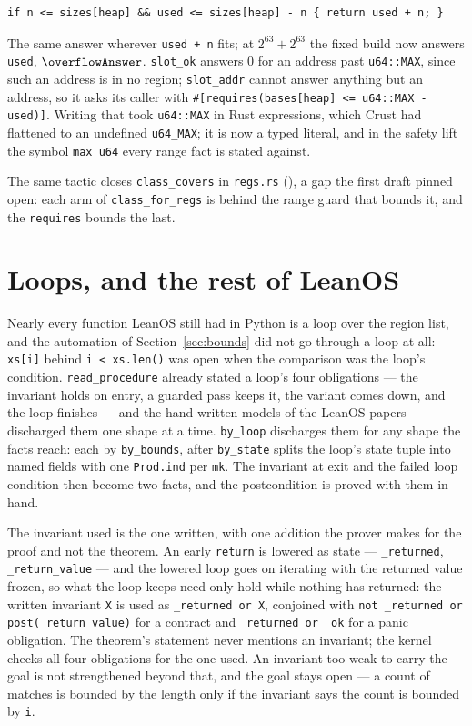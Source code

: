 \documentclass[11pt]{article}
\begin{document}
\begin{lstlisting}
if n <= sizes[heap] && used <= sizes[heap] - n { return used + n; }
\end{lstlisting}

The same answer wherever \texttt{used + n} fits; at $2^{63} + 2^{63}$ the
fixed build now answers \texttt{used}, $\overflowAnswer$.
\texttt{slot\_ok} answers 0 for an address past \texttt{u64::MAX}, since
such an address is in no region; \texttt{slot\_addr} cannot answer
anything but an address, so it asks its caller with
\texttt{\#[requires(bases[heap] <= u64::MAX - used)]}.  Writing that took
\texttt{u64::MAX} in Rust expressions, which Crust had flattened to an
undefined \texttt{u64\_MAX}; it is now a typed literal, and in the safety
lift the symbol \texttt{max\_u64} every range fact is stated against.

The same tactic closes \texttt{class\_covers} in \texttt{regs.rs}
(\classCoversProved{}), a gap the first draft pinned open: each arm of
\texttt{class\_for\_regs} is behind the range guard that bounds it, and the
\texttt{requires} bounds the last.

\section{Loops, and the rest of LeanOS}\label{sec:loops}

Nearly every function LeanOS still had in Python is a loop over the region
list, and the automation of Section~\ref{sec:bounds} did not go through a
loop at all: \texttt{xs[i]} behind \texttt{i < xs.len()} was open when the
comparison was the loop's condition.  \texttt{read\_procedure} already
stated a loop's four obligations --- the invariant holds on entry, a guarded
pass keeps it, the variant comes down, and the loop finishes --- and the
hand-written models of the LeanOS papers discharged them one shape at a
time.  \texttt{by\_loop} discharges them for any shape the facts reach:
each by \texttt{by\_bounds}, after \texttt{by\_state} splits the loop's
state tuple into named fields with one \texttt{Prod.ind} per \texttt{mk}.
The invariant at exit and the failed loop condition then become two facts,
and the postcondition is proved with them in hand.

The invariant used is the one written, with one addition the prover makes
for the proof and not the theorem.  An early \texttt{return} is lowered as
state --- \texttt{\_returned}, \texttt{\_return\_value} --- and the lowered
loop goes on iterating with the returned value frozen, so what the loop
keeps need only hold while nothing has returned: the written invariant
\texttt{X} is used as \texttt{\_returned or X}, conjoined with
\texttt{not \_returned or post(\_return\_value)} for a contract and
\texttt{\_returned or \_ok} for a panic obligation.  The theorem's statement
never mentions an invariant; the kernel checks all four obligations for the
one used.  An invariant too weak to carry the goal is not strengthened
beyond that, and the goal stays open --- a count of matches is bounded by
the length only if the invariant says the count is bounded by \texttt{i}.
\end{document}

